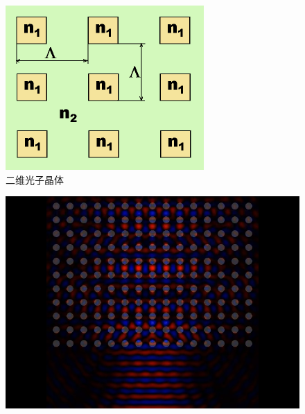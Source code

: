 \begin{frame}[c]
\begin{columns}
\begin{column}{.3\textwidth}
\begin{figure}[H]
                \includegraphics[width=1.\textwidth]{figures/Photonic crystal spectrometer_5.png} %
                \caption{二维光子晶体} %
            \end{figure}
            \begin{figure}[H] %
                \centering %
                \includegraphics[width=1.\textwidth]{figures/Photonic crystal spectrometer_6.png} %
            \end{figure}
        \end{column}
    \end{columns}
\end{frame}